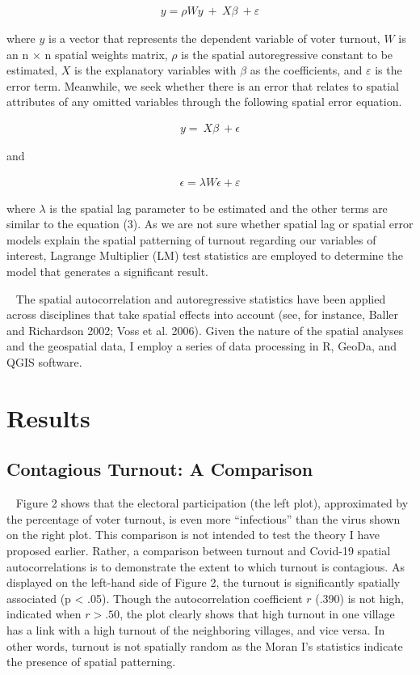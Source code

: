 \documentclass[
  12pt,
]{article}
\begin{document}
\begin{align}
y = \rho W y \ + \ X \beta \ +  \varepsilon
\end{align}

where \(y\) is a vector that represents the dependent variable of voter
turnout, \(W\) is an n × n spatial weights matrix, \(\rho\) is the
spatial autoregressive constant to be estimated, \(X\) is the
explanatory variables with \(\beta\) as the coefficients, and
\(\varepsilon\) is the error term. Meanwhile, we seek whether there is
an error that relates to spatial attributes of any omitted variables
through the following spatial error equation.

\begin{align}
y =\ X \beta \ +  \epsilon
\end{align}

and

\begin{align}
\epsilon = \lambda W \epsilon + \varepsilon
\end{align}

where \(\lambda\) is the spatial lag parameter to be estimated and the
other terms are similar to the equation (3). As we are not sure whether
spatial lag or spatial error models explain the spatial patterning of
turnout regarding our variables of interest, Lagrange Multiplier (LM)
test statistics are employed to determine the model that generates a
significant result.

~ The spatial autocorrelation and autoregressive statistics have been
applied across disciplines that take spatial effects into account (see,
for instance, Baller and Richardson 2002; Voss et al. 2006). Given the
nature of the spatial analyses and the geospatial data, I employ a
series of data processing in R, GeoDa, and QGIS software.

\hypertarget{results}{%
\section{Results}\label{results}}

\hypertarget{contagious-turnout-a-comparison}{%
\subsection{Contagious Turnout: A
Comparison}\label{contagious-turnout-a-comparison}}

~ Figure 2 shows that the electoral participation (the left plot),
approximated by the percentage of voter turnout, is even more
``infectious'' than the virus shown on the right plot. This comparison
is not intended to test the theory I have proposed earlier. Rather, a
comparison between turnout and Covid-19 spatial autocorrelations is to
demonstrate the extent to which turnout is contagious. As displayed on
the left-hand side of Figure 2, the turnout is significantly spatially
associated (p \textless{} .05). Though the autocorrelation coefficient
\(r\) (.390) is not high, indicated when \(r>.50\), the plot clearly
shows that high turnout in one village has a link with a high turnout of
the neighboring villages, and vice versa. In other words, turnout is not
spatially random as the Moran I's statistics indicate the presence of
spatial patterning.
\end{document}
